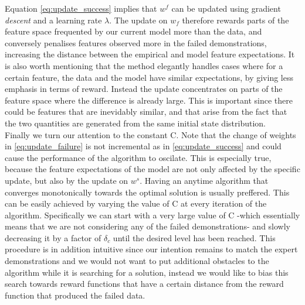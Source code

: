 \documentclass[letterpaper]{article}
\DeclareMathOperator*{\argmax}{\arg\!\max}
\newcommand{\sw}[1]{\textcolor{red}{SW: #1}}
\newcommand{\sw}[1]{}
\begin{document}
Equation \eqref{eq:update_success} implies that $w^f$ can be updated using gradient \emph{descent} and a learning rate $\lambda$.
The update on $w_f$ therefore rewards parts of the feature space frequented by our current model more than the data, and conversely penalises features observed more in the failed demonstrations, increasing the distance between the empirical and model feature expectations. It is also worth mentioning that the method elegantly handles cases where for a certain feature, the data and the model have similar expectations, by giving less emphasis in terms of reward. Instead the update concentrates on parts of the feature space where the difference is already large. This is important since there could be features that are inevidably similar, and that arise from the fact that the two quantities are generated from the same initial state distribution.\\
Finally we turn our attention to the constant C. Note that the change of weights in \eqref{eq:update_failure} is not incremental as in \eqref{eq:update_success} and could cause the performance of the algorithm to oscilate. This is especially true, because the feature expectations of the model are not only affected by the specific update, but also by the update on $w^s$. Having an anytime algorithm that converges monotonically towards the optimal solution is usually preffered. This can be easily achieved by varying the value of C at every iteration of the algorithm. Specifically we can start with a very large value of C -which essentially means that we are not considering any of the failed demonstrations- and slowly decreasing it by a factor of $\delta_c$ until the desired level has been reached. This procedure is in addition 
intuitive since our intention remains to match the expert demonstrations and we would not want to put additional obstacles to the algorithm while it is searching for a solution, instead we would like to bias this search towards reward functions that have a certain distance from the reward function that produced the failed data. 


	
\end{document}

